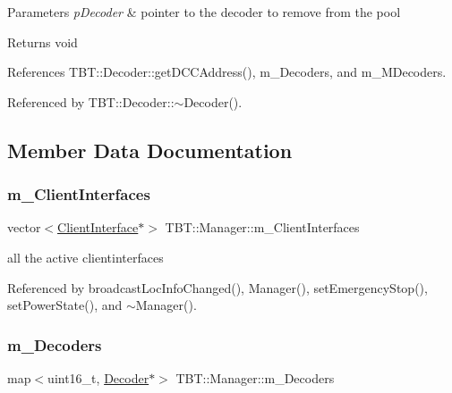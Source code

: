 \begin{DoxyParams}{Parameters}
{\em p\+Decoder} & pointer to the decoder to remove from the pool\\
\hline
\end{DoxyParams}
\begin{DoxyReturn}{Returns}
void 
\end{DoxyReturn}


References T\+B\+T\+::\+Decoder\+::get\+D\+C\+C\+Address(), m\+\_\+\+Decoders, and m\+\_\+\+M\+Decoders.



Referenced by T\+B\+T\+::\+Decoder\+::$\sim$\+Decoder().



\subsection{Member Data Documentation}
\mbox{\label{classTBT_1_1Manager_a891445980d26bff2cb101a96ffadb36d_a891445980d26bff2cb101a96ffadb36d}} 
\subsubsection{\texorpdfstring{m\+\_\+\+Client\+Interfaces}{m\_ClientInterfaces}}
{\footnotesize\ttfamily vector$<$\hyperlink{classTBT_1_1ClientInterface}{Client\+Interface}$\ast$$>$ T\+B\+T\+::\+Manager\+::m\+\_\+\+Client\+Interfaces\hspace{0.3cm}{\ttfamily [private]}}



all the active clientinterfaces 



Referenced by broadcast\+Loc\+Info\+Changed(), Manager(), set\+Emergency\+Stop(), set\+Power\+State(), and $\sim$\+Manager().

\mbox{\label{classTBT_1_1Manager_a37238f0b1b6d04d9a405f66f560c8d1a_a37238f0b1b6d04d9a405f66f560c8d1a}} 
\subsubsection{\texorpdfstring{m\+\_\+\+Decoders}{m\_Decoders}}
{\footnotesize\ttfamily map$<$uint16\+\_\+t, \hyperlink{classTBT_1_1Decoder}{Decoder}$\ast$$>$ T\+B\+T\+::\+Manager\+::m\+\_\+\+Decoders\hspace{0.3cm}{\ttfamily [private]}}



